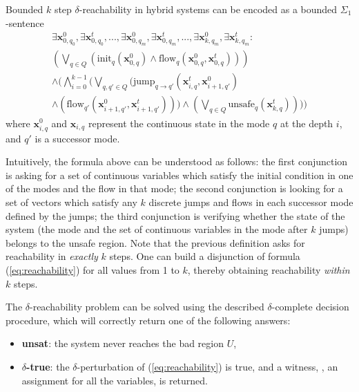 \begin{definition} \cite{DBLP:journals/corr/GaoKCC14}\label{def:reachability}
Bounded $k$ step $\delta$-reachability in hybrid systems can be encoded as a bounded $\Sigma_1$-sentence
\begin{equation} \label{eq:reachability}
\begin{split}
\exists \textbf{x}^{0}_{0,q_0}, \exists \textbf{x}^{t}_{0,q_0}, ... , \exists \textbf{x}^{0}_{0,q_m}, \exists \textbf{x}^{t}_{0,q_m} , ... , \exists \textbf{x}^{0}_{k,q_m}, \exists \textbf{x}^{t}_{k,q_m}:\\
(\bigvee_{q \in Q} (\text{init}_{q}(\textbf{x}^{0}_{0,q}) \wedge \text{flow}_{q}(\textbf{x}^{0}_{0,q},\textbf{x}^{t}_{0,q}))) \\
\wedge (\bigwedge_{i=0}^{k-1} (\bigvee_{q,q' \in Q}(\text{jump}_{q \rightarrow q'}(\textbf{x}^{t}_{i,q}, \textbf{x}^{0}_{i+1,q'}) \\
\wedge (\text{flow}_{q'}(\textbf{x}^{0}_{i+1,q'}, \textbf{x}^{t}_{i+1,q'}))) \wedge (\bigvee_{q \in Q} \text{unsafe}_{q}(\textbf{x}^{t}_{k,q}))))
\end{split}
\end{equation}
where $\textbf{x}^{0}_{i,q}$ and $\textbf{x}_{i,q}$ represent the continuous state in the mode $q$ at the depth $i$, and $q'$ is a successor mode.
\end{definition}

Intuitively, the formula above can be understood as follows: the first conjunction is asking for 
a set of continuous variables which satisfy the initial condition in one of the modes and the 
flow in that mode; the second conjunction is looking for a set of vectors which satisfy any $k$ 
discrete jumps and flows in each successor mode defined by the jumps; the third conjunction is 
verifying whether the state of the system (the mode and the set of continuous variables in the 
mode after $k$ jumps) belongs to the unsafe region. Note that the previous definition asks for
reachability in {\em exactly} $k$ steps. One can build a disjunction of formula (\ref{eq:reachability})
for all values from 1 to $k$, thereby obtaining reachability {\em within} $k$ steps.

The $\delta$-reachability problem can be solved using the described $\delta$-complete decision 
procedure, which will correctly return one of the following answers: 
\begin{itemize}
	\item \textbf{unsat}: the system never reaches the bad region $U$,
	\item \textbf{$\delta$-true}: the $\delta$-perturbation of (\ref{eq:reachability}) is true,
	and a witness, \ie, an assignment for all the variables, is returned.
\end{itemize}


